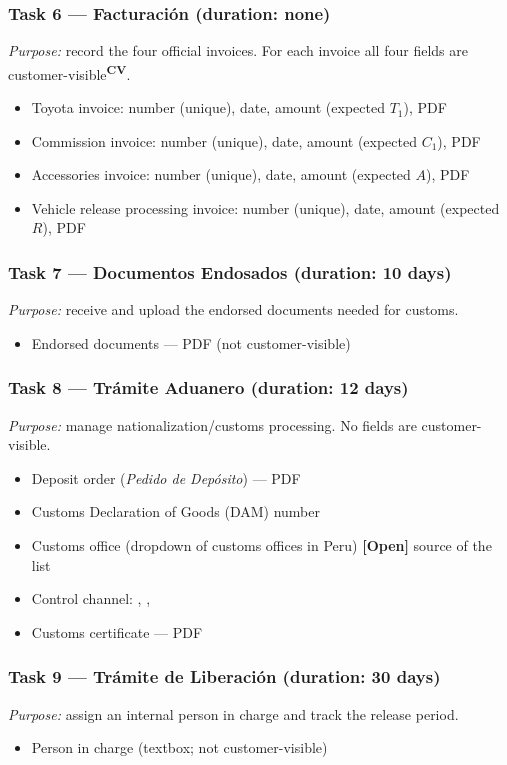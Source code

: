 \documentclass[11pt,a4paper]{article}
\newcommand{\code}[1]{\texttt{\detokenize{#1}}}
\newcommand{\tagopen}{\textcolor{red!70!black}{\textbf{[Open]}}}
\newcommand{\cv}{\textsuperscript{\textcolor{panablue}{\textbf{CV}}}}
\begin{document}
\subsubsection*{Task 6 --- Facturación (duration: none)}
\textit{Purpose:} record the four official invoices. For each invoice all four fields are customer-visible\cv{}.
\begin{itemize}
	\item Toyota invoice: number (unique), date, amount (expected $T_1$), PDF
	\item Commission invoice: number (unique), date, amount (expected $C_1$), PDF
	\item Accessories invoice: number (unique), date, amount (expected $A$), PDF
	\item Vehicle release processing invoice: number (unique), date, amount (expected $R$), PDF
\end{itemize}

\subsubsection*{Task 7 --- Documentos Endosados (duration: 10 days)}
\textit{Purpose:} receive and upload the endorsed documents needed for customs.
\begin{itemize}
	\item Endorsed documents --- PDF (not customer-visible)
\end{itemize}

\subsubsection*{Task 8 --- Trámite Aduanero (duration: 12 days)}
\textit{Purpose:} manage nationalization/customs processing. No fields are
customer-visible.
\begin{itemize}
	\item Deposit order (\emph{Pedido de Depósito}) --- PDF
	\item Customs Declaration of Goods (DAM) number
	\item Customs office (dropdown of customs offices in Peru) \tagopen{} source
	      of the list
	\item Control channel: \code{Verde}, \code{Naranja}, \code{Rojo}
	\item Customs certificate --- PDF
\end{itemize}

\subsubsection*{Task 9 --- Trámite de Liberación (duration: 30 days)}
\textit{Purpose:} assign an internal person in charge and track the release period.
\begin{itemize}
	\item Person in charge (textbox; not customer-visible)
\end{itemize}
\end{document}

